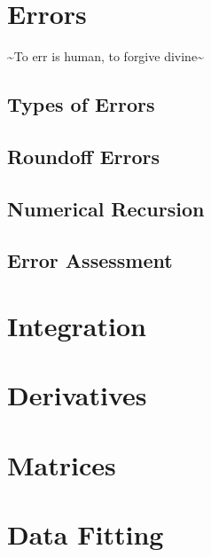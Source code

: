 \documentclass[letterpaper,10pt,english]{sphinxmanual}
\begin{document}
\chapter{Errors}
\label{\detokenize{Errors/Errors:errors}}\label{\detokenize{Errors/Errors::doc}}
\sphinxAtStartPar
\textasciitilde{}To err is human, to forgive divine\textasciitilde{}


\section{Types of Errors}
\label{\detokenize{Errors/Errors:types-of-errors}}

\section{Round\sphinxhyphen{}oﬀ Errors}
\label{\detokenize{Errors/Errors:round-off-errors}}

\section{Numerical Recursion}
\label{\detokenize{Errors/Errors:numerical-recursion}}

\section{Error Assessment}
\label{\detokenize{Errors/Errors:error-assessment}}
\sphinxstepscope


\chapter{Integration}
\label{\detokenize{Integration/Integration:integration}}\label{\detokenize{Integration/Integration::doc}}
\sphinxstepscope


\chapter{Derivatives}
\label{\detokenize{Derivatives/Derivatives:derivatives}}\label{\detokenize{Derivatives/Derivatives::doc}}
\sphinxstepscope


\chapter{Matrices}
\label{\detokenize{Matrices/Matrices:matrices}}\label{\detokenize{Matrices/Matrices::doc}}
\sphinxstepscope


\chapter{Data Fitting}
\label{\detokenize{DataFitting/DataFitting:data-fitting}}\label{\detokenize{DataFitting/DataFitting::doc}}
\sphinxstepscope
\end{document}
